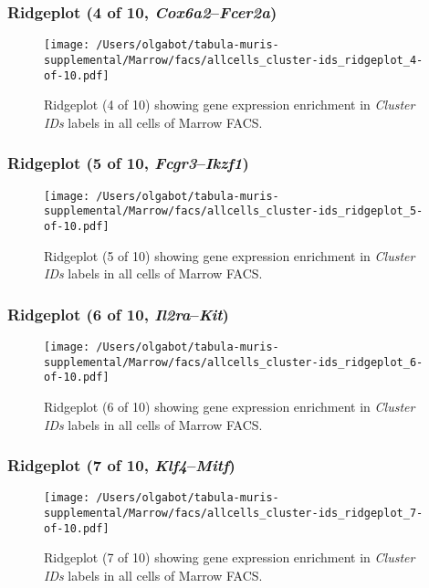 \clearpage

\subsubsection{Ridgeplot (4 of 10, \emph{Cox6a2}--\emph{Fcer2a})}
\begin{figure}[h]
\centering
\texttt{[image: /Users/olgabot/tabula-muris-supplemental/Marrow/facs/allcells\_cluster-ids\_ridgeplot\_4-of-10.pdf]}

\caption{ Ridgeplot (4 of 10)  showing gene expression enrichment in \emph{Cluster IDs} labels in all cells of Marrow FACS. }
\end{figure}


\clearpage

\subsubsection{Ridgeplot (5 of 10, \emph{Fcgr3}--\emph{Ikzf1})}
\begin{figure}[h]
\centering
\texttt{[image: /Users/olgabot/tabula-muris-supplemental/Marrow/facs/allcells\_cluster-ids\_ridgeplot\_5-of-10.pdf]}

\caption{ Ridgeplot (5 of 10)  showing gene expression enrichment in \emph{Cluster IDs} labels in all cells of Marrow FACS. }
\end{figure}


\clearpage

\subsubsection{Ridgeplot (6 of 10, \emph{Il2ra}--\emph{Kit})}
\begin{figure}[h]
\centering
\texttt{[image: /Users/olgabot/tabula-muris-supplemental/Marrow/facs/allcells\_cluster-ids\_ridgeplot\_6-of-10.pdf]}

\caption{ Ridgeplot (6 of 10)  showing gene expression enrichment in \emph{Cluster IDs} labels in all cells of Marrow FACS. }
\end{figure}


\clearpage

\subsubsection{Ridgeplot (7 of 10, \emph{Klf4}--\emph{Mitf})}
\begin{figure}[h]
\centering
\texttt{[image: /Users/olgabot/tabula-muris-supplemental/Marrow/facs/allcells\_cluster-ids\_ridgeplot\_7-of-10.pdf]}

\caption{ Ridgeplot (7 of 10)  showing gene expression enrichment in \emph{Cluster IDs} labels in all cells of Marrow FACS. }
\end{figure}


